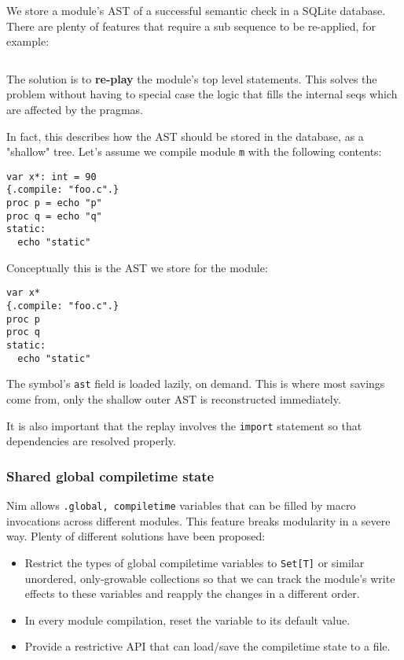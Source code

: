 We store a module's AST of a successful semantic check in a SQLite
database. There are plenty of features that require a sub sequence to be
re-applied, for example:

\begin{verbatim}
\end{verbatim}

The solution is to \textbf{re-play} the module's top level statements.
This solves the problem without having to special case the logic that
fills the internal seqs which are affected by the pragmas.

In fact, this describes how the AST should be stored in the database, as
a "shallow" tree. Let's assume we compile module \texttt{m} with the
following contents:

\begin{verbatim}
var x*: int = 90
{.compile: "foo.c".}
proc p = echo "p"
proc q = echo "q"
static:
  echo "static"
\end{verbatim}

Conceptually this is the AST we store for the module:

\begin{verbatim}
var x*
{.compile: "foo.c".}
proc p
proc q
static:
  echo "static"
\end{verbatim}

The symbol's \texttt{ast} field is loaded lazily, on demand. This is
where most savings come from, only the shallow outer AST is
reconstructed immediately.

It is also important that the replay involves the \texttt{import}
statement so that dependencies are resolved properly.

\hypertarget{shared-global-compiletime-state}{%
\subsubsection{Shared global compiletime
state}\label{shared-global-compiletime-state}}

Nim allows \texttt{.global,\ compiletime} variables that can be filled
by macro invocations across different modules. This feature breaks
modularity in a severe way. Plenty of different solutions have been
proposed:

\begin{itemize}
\tightlist
\item
  Restrict the types of global compiletime variables to
  \texttt{Set{[}T{]}} or similar unordered, only-growable collections so
  that we can track the module's write effects to these variables and
  reapply the changes in a different order.
\item
  In every module compilation, reset the variable to its default value.
\item
  Provide a restrictive API that can load/save the compiletime state to
  a file.
\end{itemize}

